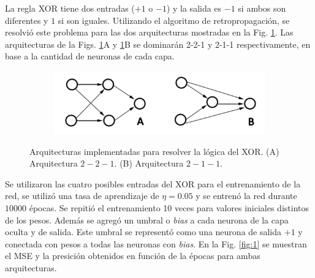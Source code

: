 \documentclass[11pt,twocolumn,twoside]{opticajnl}
\begin{document}
\vspace{0.3cm}

La regla XOR tiene dos entradas ($+1$ o $-1$) y la salida es $-1$ si ambos son diferentes y $1$ si son iguales. Utilizando el algoritmo de retropropagación, se resolvió este problema para las dos arquitecturas mostradas en la Fig. \ref{fig:esq_1}. Las arquitecturas de la Figs. \ref{fig:esq_1}A y \ref{fig:esq_1}B se dominarán 2-2-1 y 2-1-1 respectivamente, en base a la cantidad de neuronas de cada capa. 

\begin{figure}[ht]
    \centering
         \begin{subfigure}[b]{0.75\linewidth}
            \includegraphics[width=\textwidth]{Figuras/esquema1.png}
         \end{subfigure}
    \caption{Arquitecturas implementadas para resolver la lógica del XOR. (A) Arquitectura $2-2-1$. (B) Arquitectura $2-1-1$.} 
    \label{fig:esq_1}
\end{figure}

Se utilizaron las cuatro posibles entradas del XOR para el entrenamiento de la red, se utilizó una tasa de aprendizaje de $\eta = 0.05$ y se entrenó la red durante $10000$ épocas. Se repitió el entrenamiento 10 veces para valores iniciales distintos de los pesos. Además se agregó un umbral o \textit{bias} a cada neurona de la capa oculta y de salida. Este umbral se representó como una neurona de salida $+1$ y conectada con pesos a todas las neuronas con \textit{bias}. En la Fig. \ref{fig:1} se muestran el MSE y la presición obtenidos en función de la épocas para ambas arquitecturas. 
\end{document}

